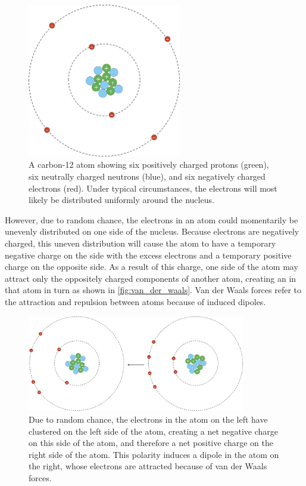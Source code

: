 \begin{figure}[h]
	\centering
	\mySfFamily
	\includegraphics[width = 0.6\textwidth]{../images/van_der_waals_normal.png}
	\caption{A carbon-12 atom showing six positively charged protons (green), six neutrally charged neutrons (blue), and six negatively charged electrons (red). Under typical circumstances, the electrons will most likely be distributed uniformly around the nucleus.}
	\label{fig:van_der_waals_normal}
\end{figure}

However, due to random chance, the electrons in an atom could momentarily be unevenly distributed on one side of the nucleus. Because electrons are negatively charged, this uneven distribution will cause the atom to have a temporary negative charge on the side with the excess electrons and a temporary positive charge on the opposite side. As a result of this charge, one side of the atom may attract only the oppositely charged components of another atom, creating an  in that atom in turn as shown in \autoref{fig:van_der_waals}. Van der Waals forces refer to the attraction and repulsion between atoms because of induced dipoles.\\

\begin{figure}[h]
	\centering
	\mySfFamily
	\includegraphics[width = 0.85\textwidth]{../images/van_der_waals.png}
	\caption{Due to random chance, the electrons in the atom on the left have clustered on the left side of the atom, creating a net negative charge on this side of the atom, and therefore a net positive charge on the right side of the atom. This polarity induces a dipole in the atom on the right, whose electrons are attracted because of van der Waals forces.}
	\label{fig:van_der_waals}
\end{figure}

